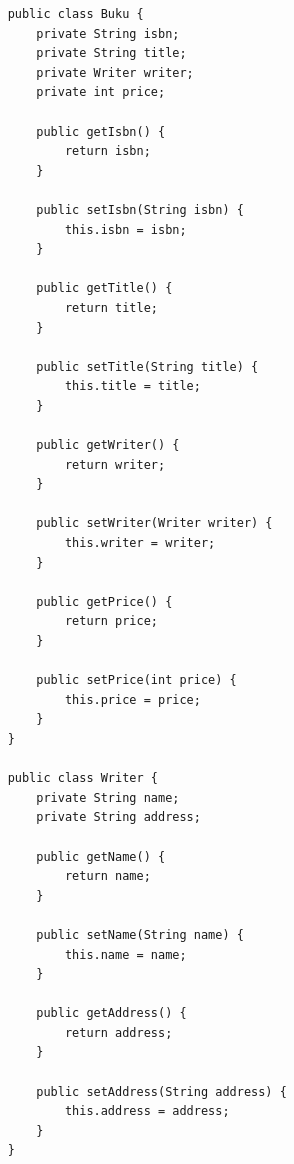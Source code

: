 \documentclass[12pt,titlepage]{article}
\begin{document}
\begin{verbatim}
    public class Buku {
        private String isbn;
        private String title;
        private Writer writer;
        private int price;

        public getIsbn() {
            return isbn;
        }

        public setIsbn(String isbn) {
            this.isbn = isbn;
        }

        public getTitle() {
            return title;
        }

        public setTitle(String title) {
            this.title = title;
        }

        public getWriter() {
            return writer;
        }

        public setWriter(Writer writer) {
            this.writer = writer;
        }

        public getPrice() {
            return price;
        }

        public setPrice(int price) {
            this.price = price;
        }
    }

    public class Writer {
        private String name;
        private String address;

        public getName() {
            return name;
        }

        public setName(String name) {
            this.name = name;
        }

        public getAddress() {
            return address;
        }

        public setAddress(String address) {
            this.address = address;
        }
    }
\end{verbatim}
\end{document}
